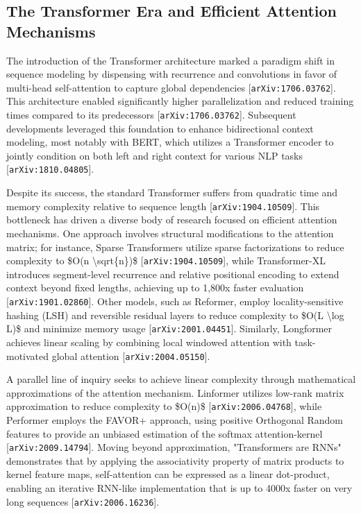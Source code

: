 \documentclass[11pt]{article}
\begin{document}
\subsection{The Transformer Era and Efficient Attention Mechanisms}

The introduction of the Transformer architecture marked a paradigm shift in sequence modeling by dispensing with recurrence and convolutions in favor of multi-head self-attention to capture global dependencies [\texttt{arXiv:1706.03762}]. This architecture enabled significantly higher parallelization and reduced training times compared to its predecessors [\texttt{arXiv:1706.03762}]. Subsequent developments leveraged this foundation to enhance bidirectional context modeling, most notably with BERT, which utilizes a Transformer encoder to jointly condition on both left and right context for various NLP tasks [\texttt{arXiv:1810.04805}].

Despite its success, the standard Transformer suffers from quadratic time and memory complexity relative to sequence length [\texttt{arXiv:1904.10509}]. This bottleneck has driven a diverse body of research focused on efficient attention mechanisms. One approach involves structural modifications to the attention matrix; for instance, Sparse Transformers utilize sparse factorizations to reduce complexity to \$O(n \textbackslash{}sqrt\{n\})\$ [\texttt{arXiv:1904.10509}], while Transformer-XL introduces segment-level recurrence and relative positional encoding to extend context beyond fixed lengths, achieving up to 1,800x faster evaluation [\texttt{arXiv:1901.02860}]. Other models, such as Reformer, employ locality-sensitive hashing (LSH) and reversible residual layers to reduce complexity to \$O(L \textbackslash{}log L)\$ and minimize memory usage [\texttt{arXiv:2001.04451}]. Similarly, Longformer achieves linear scaling by combining local windowed attention with task-motivated global attention [\texttt{arXiv:2004.05150}].

A parallel line of inquiry seeks to achieve linear complexity through mathematical approximations of the attention mechanism. Linformer utilizes low-rank matrix approximation to reduce complexity to \$O(n)\$ [\texttt{arXiv:2006.04768}], while Performer employs the FAVOR+ approach, using positive Orthogonal Random features to provide an unbiased estimation of the softmax attention-kernel [\texttt{arXiv:2009.14794}]. Moving beyond approximation, "Transformers are RNNs" demonstrates that by applying the associativity property of matrix products to kernel feature maps, self-attention can be expressed as a linear dot-product, enabling an iterative RNN-like implementation that is up to 4000x faster on very long sequences [\texttt{arXiv:2006.16236}].
\end{document}
